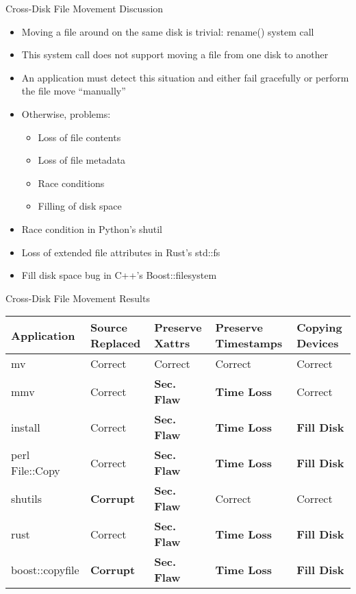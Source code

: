 \documentclass[pdf]{beamer}
\begin{document}
\begin{frame}{Cross-Disk File Movement Discussion}
  \begin{itemize}
  \item{Moving a file around on the same disk is trivial: rename() system
      call}
  \item{This system call does not support moving a file from one disk to
      another}
  \item{An application must detect this situation and either fail
      gracefully or perform the file move ``manually''}
  \item{Otherwise, problems:}
    \begin{itemize}
    \item{Loss of file contents}
    \item{Loss of file metadata}
    \item{Race conditions}
    \item{Filling of disk space}
    \end{itemize}
  \item{Race condition in Python's shutil}
  \item{Loss of extended file attributes in Rust's std::fs}
  \item{Fill disk space bug in C++'s Boost::filesystem}
  \end{itemize}
\end{frame}


\begin{frame}{Cross-Disk File Movement Results}
  \tiny{}
    \begin{tabular}{l p{1cm} p{1cm} p{1.2cm} p{1cm}}
        Application     & Source Replaced & Preserve Xattrs & Preserve Timestamps & Copying Devices\\
\hline
        mv              & Correct             & Correct         & Correct             & Correct\\
        mmv             & Correct             & {\bf Sec. Flaw} & {\bf Time
Loss} & Correct\\
        install         & Correct             & {\bf Sec. Flaw} & {\bf Time
Loss} & {\bf Fill Disk} \\
        perl File::Copy & Correct             & {\bf Sec. Flaw} & {\bf Time
Loss} & {\bf Fill Disk} \\
        shutils         & {\bf Corrupt}	& {\bf Sec. Flaw} 	& Correct             & Correct\\
        rust            & Correct             & {\bf Sec. Flaw} & {\bf Time
Loss} & {\bf Fill Disk} \\
        boost::copyfile & {\bf Corrupt}	      & {\bf Sec. Flaw} & {\bf Time
Loss} & {\bf Fill Disk} \\
    \end{tabular}
\end{frame}
\end{document}
